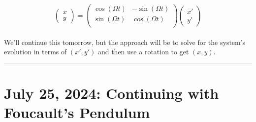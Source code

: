\documentclass[11pt]{article}
\begin{document}
\[
\begin{pmatrix}
  x \\ y 
\end{pmatrix} = \begin{pmatrix}
  \cos(\Omega t) & -\sin(\Omega t) \\
  \sin(\Omega t) & \cos(\Omega t) \\
\end{pmatrix} \begin{pmatrix}
  x' \\ y'
\end{pmatrix}
\]
\\
We'll continue this tomorrow, but the approach will be to solve for the system's evolution in terms of $(x', y')$ and then use a rotation to get $(x,y)$.
\hrule

\pagebreak
\section{July 25, 2024: Continuing with Foucault's Pendulum} 
\end{document}
